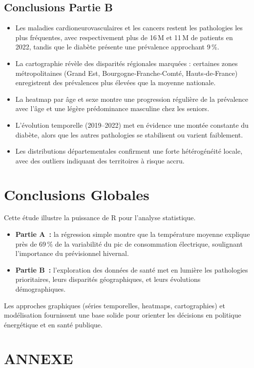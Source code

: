 \documentclass[12pt,a4paper]{article}
\begin{document}
\subsection{Conclusions Partie B}
\begin{itemize}
  \item Les maladies cardioneurovasculaires et les cancers restent les pathologies les plus fréquentes, avec respectivement plus de 16 M et 11 M de patients en 2022, tandis que le diabète présente une prévalence approchant 9 \%.  
  \item La cartographie révèle des disparités régionales marquées : certaines zones métropolitaines (Grand Est, Bourgogne‑Franche‑Comté, Hauts‑de‑France) enregistrent des prévalences plus élevées que la moyenne nationale.  
  \item La heatmap par âge et sexe montre une progression régulière de la prévalence avec l’âge et une légère prédominance masculine chez les seniors.  
  \item L’évolution temporelle (2019–2022) met en évidence une montée constante du diabète, alors que les autres pathologies se stabilisent ou varient faiblement.  
  \item Les distributions départementales confirment une forte hétérogénéité locale, avec des outliers indiquant des territoires à risque accru.  
\end{itemize}

\section*{Conclusions Globales}
Cette étude illustre la puissance de R pour l’analyse statistique.  
\begin{itemize}
  \item \textbf{Partie A :} la régression simple montre que la température moyenne explique près de 69 \% de la variabilité du pic de consommation électrique, soulignant l’importance du prévisionnel hivernal.  
  \item \textbf{Partie B :} l’exploration des données de santé met en lumière les pathologies prioritaires, leurs disparités géographiques, et leurs évolutions démographiques.  
\end{itemize}
Les approches graphiques (séries temporelles, heatmaps, cartographies) et modélisation fournissent une base solide pour orienter les décisions en politique énergétique et en santé publique.  


\newpage

\section{ANNEXE}
\end{document}
